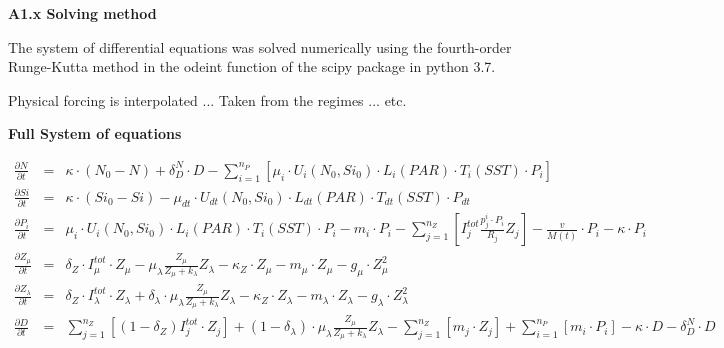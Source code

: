 {\bf {\large A1.x Solving method}}

The system of differential equations was solved numerically using the fourth-order Runge-Kutta method in the odeint function of the scipy package in python 3.7. 

Physical forcing is interpolated ... Taken from the regimes ... etc.


{\bf {\large Full System of equations}}

\begin{eqnarray}
\frac{\partial N}{\partial t} & = & 
\kappa \cdot \left(N_{0} - N\right) + 
\delta^{N}_{D} \cdot D -
\sum_{i=1}^{n_P} [\mu_i \cdot U_{i}(N_0,Si_0)\cdot L_i(PAR)\cdot T_i(SST) \cdot P_{i}] 
\nonumber \\
\frac{\partial Si}{\partial t} & = & 
\kappa \cdot \left(Si_{0} - Si\right) 
- \mu_{dt} \cdot U_{dt}(N_0,Si_0) \cdot L_{dt}(PAR)\cdot T_{dt}(SST) \cdot P_{dt}
\nonumber \\
\frac{\partial P_{i}}{\partial t} & = & 
\mu_{i} \cdot U_{i}(N_0,Si_0)\cdot L_{i}(PAR)\cdot T_{i}(SST) \cdot P_{i}
- m_{i} \cdot P_{i}
- \sum_{j=1}^{n_Z} [I^{tot}_j \frac{p^i_{j} \cdot P_{i}} {R_{j}} Z_{j}] -
\frac{v}{M(t)} \cdot P_{i} -
\kappa \cdot P_{i}
\nonumber \\
\frac{\partial Z_{\mu}}{\partial t} & = & 
\delta_Z \cdot I^{tot}_{\mu} \cdot Z_{\mu}-
\mu^{}_{\lambda} \frac{Z_{\mu}}{Z_{\mu}+k_{\lambda}} Z_{\lambda}-
\kappa_{Z} \cdot Z_{\mu} -
m_{\mu} \cdot Z_{\mu} - 
g_{\mu} \cdot Z_{\mu}^{2}
\nonumber \\
\frac{\partial Z_{\lambda}}{\partial t} & = & 
\delta_Z \cdot I^{tot}_{\lambda} \cdot Z_{\lambda}+
\delta_{\lambda} \cdot \mu^{}_{\lambda} \frac{Z_{\mu}}{Z_{\mu}+k_{\lambda}} Z_{\lambda}-
\kappa_{Z} \cdot Z_{\lambda} -
m_{\lambda} \cdot Z_{\lambda} - 
g_{\lambda} \cdot Z_{\lambda}^{2}
\nonumber \\
\frac{\partial D}{\partial t} & = & 
\sum_{j=1}^{n_Z} [(1-\delta_Z) I^{tot}_j \cdot Z_{j}] +
(1-\delta_{\lambda}) \cdot \mu^{}_{\lambda} \frac{Z_{\mu}}{Z_{\mu}+k_{\lambda}} Z_{\lambda}-
\sum_{j=1}^{n_Z} [m_j \cdot Z_{j}] +
\sum_{i=1}^{n_P} [m_i \cdot P_{i}] -
\kappa \cdot D -
\delta^{N}_{D} \cdot D
\nonumber
\end{eqnarray}
 
